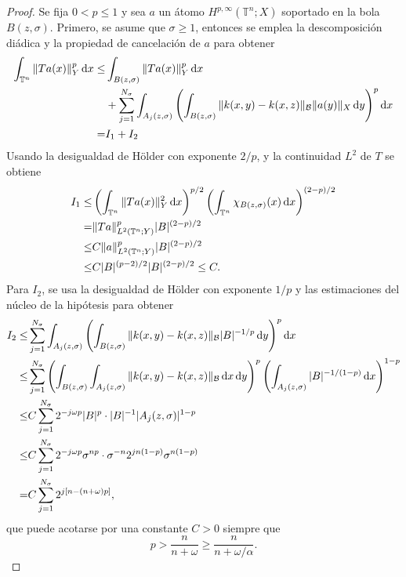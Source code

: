\begin{proof}
	Se fija $0< p \leq1$ y sea $a$ un átomo $H^{p,\infty}(\mathbb{T}^n;X)$ soportado en la bola $B(z,\sigma)$. Primero, se asume que $\sigma\geq1$, entonces se emplea la descomposición diádica y la propiedad de cancelación de $a$ para obtener
	\begin{align*}
		\int_{\mathbb{T}^n}\|Ta(x)\|^p_Y \mathop{}\!\mathrm{d} x \leq & \int_{B(z,\sigma)}\|Ta(x)\|^p_Y \mathop{}\!\mathrm{d} x \\ 
		& + \sum_{j=1}^{N_\sigma} \int_{A_j(z,\sigma)}\left( \int_{B(z,\sigma)} \|k(x, y) - k(x, z)\|_\mathcal{B} \|a(y)\|_X 
		\mathop{}\!\mathrm{d} y\right)^p \mathop{}\!\mathrm{d} x \\
		= & I_1 + I_2
	\end{align*}
	Usando la desigualdad de H\"older con exponente $2/p$, y la continuidad $L^2$ de $T$ se obtiene
	\begin{align*}
		I_1 \leq & \left( \int_{\mathbb{T}^n} \|Ta(x)\|_Y^2\mathop{}\!\mathrm{d} x \right)^{p/2}\left( \int_{\mathbb{T}^n} \chi_{B(z,\sigma)}(x)\mathop{}\!\mathrm{d} x \right)^{(2-p)/2} \\
		= & \|Ta\|_{L^2(\mathbb{T}^n;Y)}^p|B|^{(2-p)/2} \\
		\leq & C\|a\|_{L^2(\mathbb{T}^n;Y)}^p |B|^{(2-p)/2} \\
		\leq & C |B|^{(p-2)/2} |B|^{(2-p)/2}\leq C.
	\end{align*}
	Para $I_2$, se usa la desigualdad de H\"older con exponente $1/p$ y las estimaciones del núcleo de la hipótesis para obtener
	\begin{align*}
		I_2 \leq & \sum_{j=1}^{N_\sigma}\int_{A_j(z,\sigma)}\left( \int_{B(z,\sigma)} \|k(x, y) - k(x, z)\|_\mathcal{B} |B|^{-1/p} 
		\mathop{}\!\mathrm{d} y\right)^p \mathop{}\!\mathrm{d} x \\
		\leq & \sum_{j=1}^{N_\sigma} \left(\int_{B(z,\sigma)} \int_{A_j(z,\sigma)} \|k(x, y) - k(x, z)\|_\mathcal{B} \mathop{}\!\mathrm{d} x\mathop{}\!\mathrm{d} y \right)^p \left( \int_{A_j(z,\sigma)} |B|^{-1/(1-p)} \mathop{}\!\mathrm{d} x \right)^{1-p} \\
		\leq &C \sum_{j=1}^{N_\sigma}  2^{-j\omega p}|B|^p \cdot |B|^{-1}|A_j(z, \sigma)|^{1-p} \\
		\leq &C \sum_{j=1}^{N_\sigma} 2^{-j\omega p}\sigma^{np} \cdot \sigma^{-n}2^{jn(1-p)}\sigma^{n(1-p)}\\
		= & C\sum_{j=1}^{N_\sigma} 2^{j[n-(n+\omega)p]},
	\end{align*}
	que puede acotarse por una constante $C>0$ siempre que 
	\begin{equation}
		p > \frac{n}{n+\omega} \geq \frac{n}{n+\omega/\alpha}.
		\label{eq:base-p0}
	\end{equation}

\end{proof}
